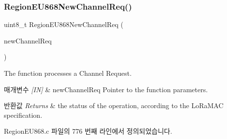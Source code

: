 \subsubsection{\texorpdfstring{Region\+E\+U868\+New\+Channel\+Req()}{RegionEU868NewChannelReq()}}
{\footnotesize\ttfamily uint8\+\_\+t Region\+E\+U868\+New\+Channel\+Req (\begin{DoxyParamCaption}\item[{\mbox{\hyperlink{group___r_e_g_i_o_n_gae2abcdb6dbb843c9faf5fd3009eca9d6}{New\+Channel\+Req\+Params\+\_\+t}} $\ast$}]{new\+Channel\+Req }\end{DoxyParamCaption})}



The function processes a Channel Request. 


\begin{DoxyParams}{매개변수}
{\em \mbox{[}\+I\+N\mbox{]}} & new\+Channel\+Req Pointer to the function parameters.\\
\hline
\end{DoxyParams}

\begin{DoxyRetVals}{반환값}
{\em Returns} & the status of the operation, according to the Lo\+Ra\+M\+AC specification. \\
\hline
\end{DoxyRetVals}


Region\+E\+U868.\+c 파일의 776 번째 라인에서 정의되었습니다.



